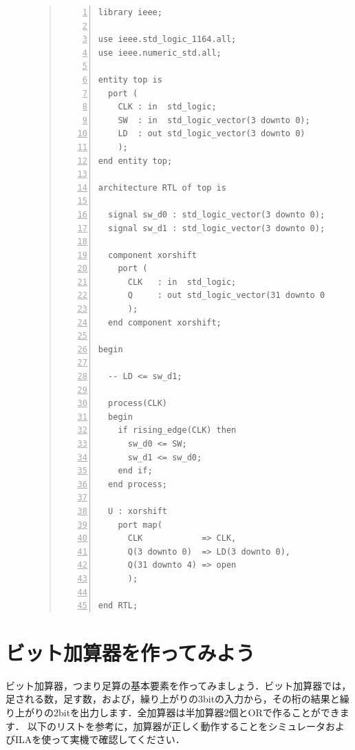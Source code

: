 \documentclass[a4paper,dvipdfmx]{jsarticle}
\begin{document}
\begin{figure}[H]
\begin{quote}
\begin{Verbatim}[frame=single, numbers=left, baselinestretch=0.8]
library ieee;

use ieee.std_logic_1164.all;
use ieee.numeric_std.all;

entity top is
  port (
    CLK : in  std_logic;
    SW  : in  std_logic_vector(3 downto 0);
    LD  : out std_logic_vector(3 downto 0)
    );
end entity top;

architecture RTL of top is

  signal sw_d0 : std_logic_vector(3 downto 0);
  signal sw_d1 : std_logic_vector(3 downto 0);

  component xorshift
    port (
      CLK   : in  std_logic;
      Q     : out std_logic_vector(31 downto 0)
      );
  end component xorshift;

begin

  -- LD <= sw_d1;
  
  process(CLK)
  begin
    if rising_edge(CLK) then
      sw_d0 <= SW;
      sw_d1 <= sw_d0;
    end if;
  end process;

  U : xorshift
    port map(
      CLK            => CLK,
      Q(3 downto 0)  => LD(3 downto 0),
      Q(31 downto 4) => open
      );

end RTL;
\end{Verbatim}
\end{quote}
\end{figure}
  

\section{ビット加算器を作ってみよう}
ビット加算器，つまり足算の基本要素を作ってみましょう．ビット加算器では，足される数，足す数，および，繰り上がりの3bitの入力から，その桁の結果と繰り上がりの2bitを出力します．全加算器は半加算器2個とORで作ることができます．
以下のリストを参考に，加算器が正しく動作することをシミュレータおよびILAを使って実機で確認してください．
\end{document}
